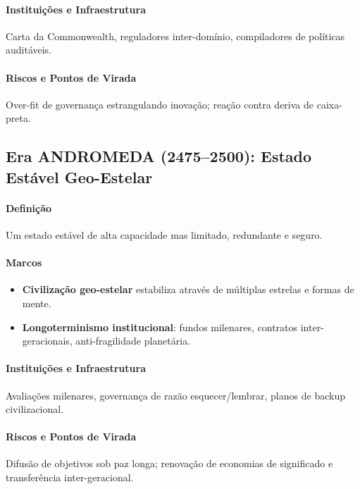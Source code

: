 \documentclass[11pt]{article}
\begin{document}
\begin{itemize}[noitemsep]
\begin{itemize}[noitemsep]
\begin{itemize}[noitemsep]
\paragraph{Instituições e Infraestrutura} Carta da Commonwealth, reguladores inter-domínio, compiladores de políticas auditáveis.

\paragraph{Riscos e Pontos de Virada} Over-fit de governança estrangulando inovação; reação contra deriva de caixa-preta.

\subsection{Era ANDROMEDA (2475–2500): Estado Estável Geo-Estelar}
\paragraph{Definição} Um estado estável de alta capacidade mas limitado, redundante e seguro.

\paragraph{Marcos}
\begin{itemize}[noitemsep]
  \item \textbf{Civilização geo-estelar} estabiliza através de múltiplas estrelas e formas de mente.
  \item \textbf{Longoterminismo institucional}: fundos milenares, contratos inter-geracionais, anti-fragilidade planetária.
\end{itemize}

\paragraph{Instituições e Infraestrutura} Avaliações milenares, governança de razão esquecer/lembrar, planos de backup civilizacional.

\paragraph{Riscos e Pontos de Virada} Difusão de objetivos sob paz longa; renovação de economias de significado e transferência inter-geracional.


\end{itemize}
\end{itemize}
\end{itemize}
\end{document}
